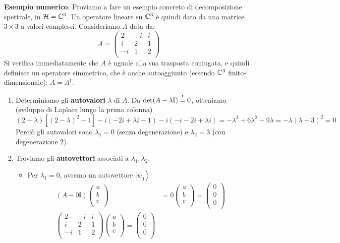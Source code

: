 \textbf{Esempio numerico}. 
Proviamo a fare un esempio concreto di decomposizione spettrale, in $\mathcal{H} = \mathbb{C}^3$. Un operatore lineare su $\mathbb{C}^3$ è quindi dato da una matrice $3\times 3$ a valori complessi. Consideriamo $A$ data da:
\[
A=\left(\begin{matrix}2&-i&i\\i&2&1\\-i&1&2\\\end{matrix}\right) 
\]
Si verifica immediatamente che $A$ è uguale alla sua trasposta coniugata, e quindi definisce un operatore simmetrico, che è anche autoaggiunto (essendo $\mathbb{C}^3$ finito-dimensionale): $A = A^\dag$.\\
\begin{enumerate}
    \item Determiniamo gli \textbf{autovalori} $\lambda$ di $A$. Da $\operatorname{det}(A-\lambda \mathbb{I}) \overset{!}{=} 0$, otteniamo (sviluppo di Laplace lungo la prima colonna)
    \[
    (2-\lambda)[(2-\lambda)^2-1]-i(-2i+\lambda i -1)-i(-i -2i +\lambda i) = -\lambda^3 + 6\lambda^2 - 9\lambda = -\lambda(\lambda -3)^2 = 0
    \]
    Perciò gli autovalori sono $\lambda_1 = 0$ (senza degenerazione) e $\lambda_2 = 3$ (con degenerazione $2$).\\
    \item Troviamo gli \textbf{autovettori} associati a $\lambda_1, \lambda_2$.
    \begin{itemize}
    \item Per $\lambda_1 =0$, avremo un autovettore $\left|\psi_0\right\rangle$
	\begin{align*}
	\left(A-0\mathbb{I}\right)\left(\begin{matrix}a\\b\\c\\\end{matrix}\right)&=0\left(\begin{matrix}a\\b\\c\\\end{matrix}\right)=\left(\begin{matrix}0\\0\\0\\\end{matrix}\right)\\
	\left(\begin{matrix}2&-i&i\\i&2&1\\-i&1&2\\\end{matrix}\right)\left(\begin{matrix}a\\b\\c\\\end{matrix}\right)=\left(\begin{matrix}0\\0\\0\\\end{matrix}\right)

\end{align*}
\end{itemize}
\end{enumerate}
